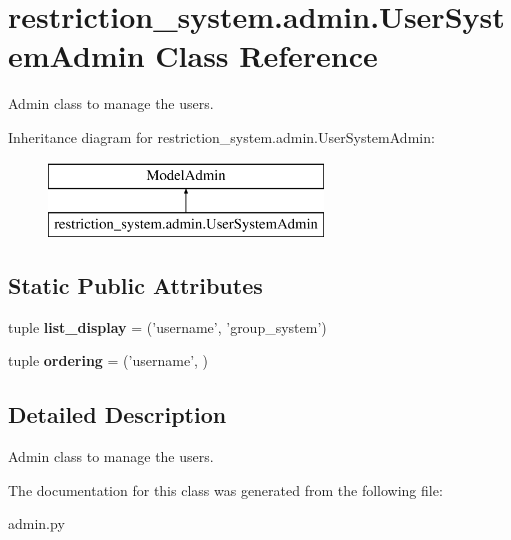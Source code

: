\hypertarget{classrestriction__system_1_1admin_1_1UserSystemAdmin}{}\section{restriction\+\_\+system.\+admin.\+User\+System\+Admin Class Reference}
\label{classrestriction__system_1_1admin_1_1UserSystemAdmin}


Admin class to manage the users.  


Inheritance diagram for restriction\+\_\+system.\+admin.\+User\+System\+Admin\+:\begin{figure}[H]
\begin{center}
\leavevmode
\includegraphics[height=2.000000cm]{classrestriction__system_1_1admin_1_1UserSystemAdmin}
\end{center}
\end{figure}
\subsection*{Static Public Attributes}
\begin{DoxyCompactItemize}
\item 
\hypertarget{classrestriction__system_1_1admin_1_1UserSystemAdmin_a672ac69306bd71de4336eb0e6f105c6d}{}tuple {\bfseries list\+\_\+display} = ('username', 'group\+\_\+system')\label{classrestriction__system_1_1admin_1_1UserSystemAdmin_a672ac69306bd71de4336eb0e6f105c6d}

\item 
\hypertarget{classrestriction__system_1_1admin_1_1UserSystemAdmin_a7630d55938dd95b8fe49d16d375eee82}{}tuple {\bfseries ordering} = ('username', )\label{classrestriction__system_1_1admin_1_1UserSystemAdmin_a7630d55938dd95b8fe49d16d375eee82}

\end{DoxyCompactItemize}


\subsection{Detailed Description}
Admin class to manage the users. 



The documentation for this class was generated from the following file\+:\begin{DoxyCompactItemize}
\item 
admin.\+py\end{DoxyCompactItemize}
